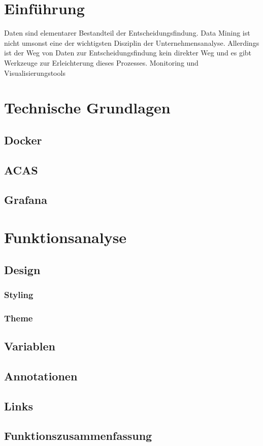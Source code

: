 \documentclass[a4paper, 12pt, oneside]{scrbook}
\begin{document}
	\frontmatter
	
	
	\tableofcontents
	\listoffigures
	\nocite{*}

	\mainmatter

	\pagebreak
	\chapter{Einführung}
	
	Daten sind elementarer Bestandteil der Entscheidungsfindung. Data Mining ist nicht umsonst eine der wichtigsten Disziplin der Unternehmensanalyse. Allerdings ist der Weg von Daten zur Entscheidungsfindung kein direkter Weg und es gibt Werkzeuge zur Erleichterung dieses Prozesses. Monitoring und Visualisierungstools 
	
	
	\chapter{Technische Grundlagen}
		\section{Docker}
		\section{ACAS}
		\section{Grafana}
	
	\chapter{Funktionsanalyse}
	 \section{Design}
	 	\subsection{Styling}
	 	\subsection{Theme}
	 \section{Variablen}
	 \section{Annotationen}
	 \section{Links}
	 \section{Funktionszusammenfassung}
	
	\frontmatter
	\printbibliography
\end{document}
